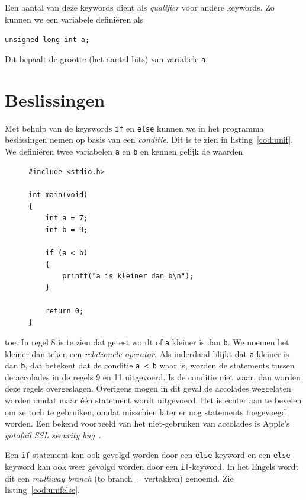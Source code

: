 Een aantal van deze keywords dient als \textsl{qualifier} voor andere keywords. Zo kunnen we een variabele definiëren als

\hspace*{1em}\texttt{unsigned long int a;}

Dit bepaalt de grootte (het aantal bits) van variabele \texttt{a}.


\section{Beslissingen}

Met behulp van de keyswords \texttt{if} en \texttt{else} kunnen we in het programma beslissingen nemen op basis van een \textsl{conditie}. Dit is te zien in listing~\ref{cod:unif}. We definiëren twee variabelen \texttt{a} en \texttt{b} en kennen gelijk de waarden 
%
\begin{figure}[!b]
\begin{lstlisting}[caption=Afdrukken van tekst op basis van een beslissing.,label=cod:unif]
#include <stdio.h>

int main(void)
{
    int a = 7;
    int b = 9;
    
    if (a < b)
    {
        printf("a is kleiner dan b\n");
    }
    
    return 0;
}
\end{lstlisting}
\end{figure}
%
toe. In regel 8 is te zien dat getest wordt of \texttt{a} kleiner is dan \texttt{b}. We noemen het kleiner-dan-teken een \textsl{relationele operator}. Als inderdaad blijkt dat \texttt{a} kleiner is dan \texttt{b}, dat betekent dat de conditie \texttt{a < b} waar is, worden de statements tussen de accolades in de regels 9 en 11 uitgevoerd. Is de conditie niet waar, dan worden deze regels overgeslagen. Overigens mogen in dit geval de accolades weggelaten worden omdat maar één statement wordt uitgevoerd. Het is echter aan te bevelen om ze toch te gebruiken, omdat misschien later er nog statements toegevoegd worden. Een bekend voorbeeld van het niet-gebruiken van accolades is Apple's \textsl{gotofail SSL security bug}~\cite{barr2014}.


Een \texttt{if}-statement kan ook gevolgd worden door een \texttt{else}-keyword en een \texttt{else}-keyword kan ook weer gevolgd worden door een \texttt{if}-keyword. In het Engels wordt dit een \textsl{multiway branch} (to branch = vertakken) genoemd. Zie listing~\ref{cod:unifelse}.

